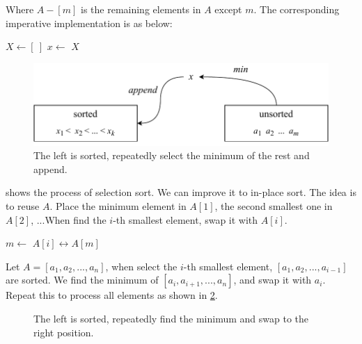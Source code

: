 \documentclass[b5paper]{article}
\begin{document}
Where $A - [m]$ is the remaining elements in $A$ except $m$. The corresponding imperative implementation is as below:

\begin{algorithmic}[1]
  \State $X \gets [\ ]$
    \State $x \gets$ 
    \State {}
    \State {}
  \EndWhile
  \State \Return $X$
\EndFunction
\end{algorithmic}

\begin{figure}[htbp]
  \centering
  \includegraphics[scale=0.8]{img/ssort}
  \caption{The left is sorted, repeatedly select the minimum of the rest and append.}
  \label{fig:sel-sort}
\end{figure}

 shows the process of selection sort. We can improve it to in-place sort. The idea is to reuse $A$. Place the minimum element in $A[1]$, the second smallest one in $A[2]$, ...When find the $i$-th smallest element, swap it with $A[i]$.

\begin{algorithmic}[1]
    \State $m \gets$ 
    \State {} $A[i] \leftrightarrow A[m]$
  \EndFor
\EndFunction
\end{algorithmic}

Let $A = [a_1, a_2, ..., a_n]$, when select the $i$-th smallest element, $[a_1, a_2, ..., a_{i-1}]$ are sorted. We find the minimum of $[a_i, a_{i+1}, ..., a_n]$, and swap it with $a_i$. Repeat this to process all elements as shown in \cref{fig:in-place-ssort}.

\begin{figure}[htbp]
  \centering
  \caption{The left is sorted, repeatedly find the minimum and swap to the right position.}
  \label{fig:in-place-ssort}
\end{figure}
\end{document}
